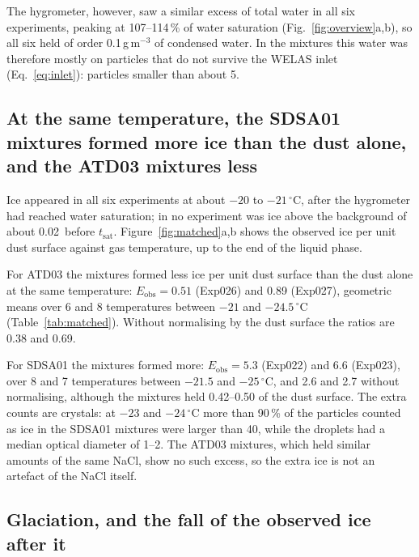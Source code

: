 The hygrometer, however, saw a similar excess of total water in all six experiments, peaking at 107--114\,\% of water saturation (Fig.~\ref{fig:overview}a,b), so all six held of order 0.1\,g\,m$^{-3}$ of condensed water. In the mixtures this water was therefore mostly on particles that do not survive the WELAS inlet (Eq.~\ref{eq:inlet}): particles smaller than about 5\um.

\subsection{At the same temperature, the SDSA01 mixtures formed more ice than the dust alone, and the ATD03 mixtures less}\label{sec:obs-ice}

Ice appeared in all six experiments at about $-20$ to $-21\,^\circ$C, after the hygrometer had reached water saturation; in no experiment was ice above the background of about 0.02\cmc\ before $t_\mathrm{sat}$. Figure~\ref{fig:matched}a,b shows the observed ice per unit dust surface against gas temperature, up to the end of the liquid phase.

For ATD03 the mixtures formed less ice per unit dust surface than the dust alone at the same temperature: $E_\mathrm{obs} = 0.51$ (Exp026) and 0.89 (Exp027), geometric means over 6 and 8 temperatures between $-21$ and $-24.5\,^\circ$C (Table~\ref{tab:matched}). Without normalising by the dust surface the ratios are 0.38 and 0.69.

For SDSA01 the mixtures formed more: $E_\mathrm{obs} = 5.3$ (Exp022) and 6.6 (Exp023), over 8 and 7 temperatures between $-21.5$ and $-25\,^\circ$C, and 2.6 and 2.7 without normalising, although the mixtures held 0.42--0.50 of the dust surface. The extra counts are crystals: at $-23$ and $-24\,^\circ$C more than 90\,\% of the particles counted as ice in the SDSA01 mixtures were larger than 40\um, while the droplets had a median optical diameter of 1--2\um. The ATD03 mixtures, which held similar amounts of the same NaCl, show no such excess, so the extra ice is not an artefact of the NaCl itself.

\subsection{Glaciation, and the fall of the observed ice after it}\label{sec:obs-glac}

